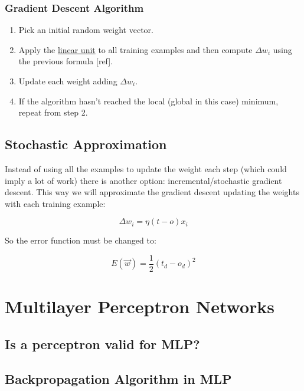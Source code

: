 \documentclass{article}
\begin{document}
	\subsubsection{Gradient Descent Algorithm}

	\begin{enumerate}

		\item Pick an initial random weight vector.
		\item Apply the \hyperref[linear_unit]{linear unit} to all training examples and then compute $\Delta w_i$  using the previous formula [ref].
		\item Update each weight adding $\Delta w_i$.
		\item If the algorithm hasn’t reached the local (global in this case) minimum, repeat from step 2.
	
	\end{enumerate}

	\subsection{Stochastic Approximation}
	Instead of using all the examples to update the weight each step (which could imply a lot of work) there is another option: incremental/stochastic gradient descent. This way we will approximate the gradient descent updating the weights with each training example:

	\begin{equation}
		\label{delta_rule}
		\Delta w_{i}= \eta (t - o) x_{i}
	\end{equation}

	So the error function must be changed to:

	\begin{equation}
		\label{error_function_stoc_square}
		E(\vec{w}) = \frac{1}{2} (t_d-o_d)^2 
	\end{equation}

\section{Multilayer Perceptron Networks}

\subsection{Is a perceptron valid for MLP?}
\subsection{Backpropagation Algorithm in MLP}
\end{document}
